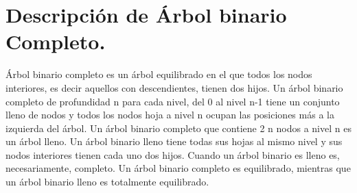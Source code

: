 \documentclass[12pt]{article}
\begin{document}
\section{Descripción de Árbol binario Completo.}

Árbol binario completo es un árbol equilibrado en el que todos los nodos interiores, es decir aquellos con descendientes, tienen dos hijos. Un árbol binario completo de profundidad n para cada nivel, del 0 al nivel n-1 tiene un conjunto lleno de nodos y todos los nodos hoja a nivel n ocupan las posiciones más a la izquierda del árbol. Un árbol binario completo que contiene 2 n nodos a nivel n es un árbol lleno. Un árbol binario lleno tiene todas sus hojas al mismo nivel y sus nodos interiores tienen cada uno dos hijos. Cuando un árbol binario es lleno es, necesariamente, completo. Un árbol binario completo es equilibrado, mientras que un árbol binario lleno es totalmente equilibrado.\\
\end{document}
